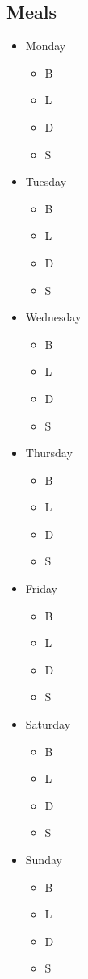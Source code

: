 \documentclass[a4paper]{article}
\begin{document}
\subsection{Meals}
\begin{itemize}
  \item Monday
		\begin{itemize}
     \item B
     \item L
     \item D
     \item S
     \end{itemize}
  \item Tuesday
		\begin{itemize}
     \item B
     \item L
     \item D
     \item S
     \end{itemize}
  \item Wednesday
		\begin{itemize}
     \item B
     \item L
     \item D
     \item S
     \end{itemize}
	\item Thursday
		\begin{itemize}
     \item B
     \item L
     \item D
     \item S
     \end{itemize}
	\item Friday
		\begin{itemize}
     \item B
     \item L
     \item D
     \item S
     \end{itemize}
	\item Saturday
		\begin{itemize}
     \item B
     \item L
     \item D
     \item S
     \end{itemize}
	\item	Sunday
		\begin{itemize}
     \item B
     \item L
     \item D
     \item S
     \end{itemize}
\end{itemize}
\newpage
\end{document}
